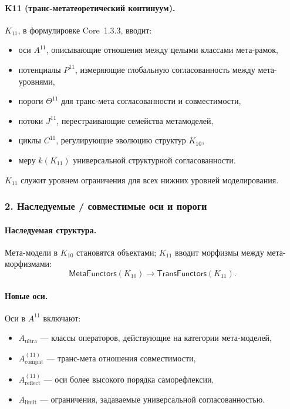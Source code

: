 \paragraph{K11 (транс-метатеоретический континуум).}
$K_{11}$, в формулировке Core~1.3.3, вводит:
\begin{itemize}
  \item оси $A^{11}$, описывающие отношения между целыми классами
        мета-рамок,
  \item потенциалы $P^{11}$, измеряющие глобальную согласованность между
        мета-уровнями,
  \item пороги $\Theta^{11}$ для транс-мета согласованности и совместимости,
  \item потоки $J^{11}$, перестраивающие семейства метамоделей,
  \item циклы $C^{11}$, регулирующие эволюцию структур $K_{10}$,
  \item меру $k(K_{11})$ универсальной структурной согласованности.
\end{itemize}

$K_{11}$ служит уровнем ограничения для всех нижних уровней моделирования.

\subsubsection{2. Наследуемые / совместимые оси и пороги}

\paragraph{Наследуемая структура.}
Мета-модели в $K_{10}$ становятся объектами; $K_{11}$ вводит морфизмы между
мета-морфизмами:
\[
\mathsf{MetaFunctors}(K_{10}) \rightarrow \mathsf{TransFunctors}(K_{11}).
\]

\paragraph{Новые оси.}
Оси в $A^{11}$ включают:
\begin{itemize}
  \item $A_{\mathrm{ultra}}$ — классы операторов, действующие на категории
        мета-моделей,
  \item $A_{\mathrm{compat}}^{(11)}$ — транс-мета отношения совместимости,
  \item $A_{\mathrm{reflect}}^{(11)}$ — оси более высокого порядка саморефлексии,
  \item $A_{\mathrm{limit}}$ — ограничения, задаваемые универсальной согласованностью.
\end{itemize}

